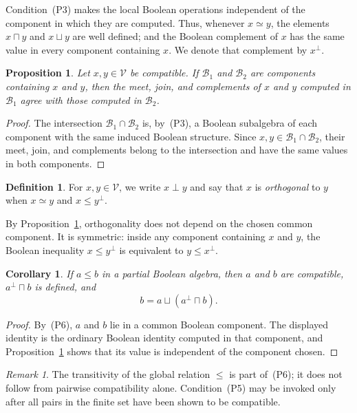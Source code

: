 \documentclass{article}   	%
\theoremstyle{plain}
\newtheorem{proposition}[theorem]{Proposition}
\newtheorem{corollary}[theorem]{Corollary}
\theoremstyle{definition}
\newtheorem{definition}[theorem]{Definition}
\theoremstyle{remark}
\newtheorem{remark}[theorem]{Remark}
\begin{document}
Condition~\rm(P3) makes the local Boolean operations independent of the
component in which they are computed.  Thus, whenever $x\simeq y$, the elements
$x\sqcap y$ and $x\sqcup y$ are well defined; and the Boolean complement of
$x$ has the same value in every component containing $x$.  We denote that
complement by $x^\perp$.

\begin{proposition}\label{prop:local-operations}
Let $x,y\in\mathcal V$ be compatible.  If $\mathcal B_1$ and $\mathcal B_2$
are components containing $x$ and $y$, then the meet, join, and complements
of $x$ and $y$ computed in $\mathcal B_1$ agree with those computed in
$\mathcal B_2$.
\end{proposition}

\begin{proof}
The intersection $\mathcal B_1\cap\mathcal B_2$ is, by~\rm(P3), a Boolean
subalgebra of each component with the same induced Boolean structure.  Since
$x,y\in\mathcal B_1\cap\mathcal B_2$, their meet, join, and complements belong
to the intersection and have the same values in both components.
\end{proof}

\begin{definition}\label{def:orth}
For $x,y\in\mathcal V$, we write $x\perp y$ and say that $x$ is
\emph{orthogonal} to $y$ when $x\simeq y$ and $x\le y^\perp$.
\end{definition}

By Proposition~\ref{prop:local-operations}, orthogonality does not depend on
the chosen common component.  It is symmetric: inside any component
containing $x$ and $y$, the Boolean inequality $x\le y^\perp$ is equivalent
to $y\le x^\perp$.

\begin{corollary}\label{cor:weak-oml}
If $a\le b$ in a partial Boolean algebra, then $a$ and $b$ are compatible,
$a^\perp\sqcap b$ is defined, and
\[
 b=a\sqcup(a^\perp\sqcap b).
\]
\end{corollary}

\begin{proof}
By~\rm(P6), $a$ and $b$ lie in a common Boolean component.  The displayed
identity is the ordinary Boolean identity computed in that component, and
Proposition~\ref{prop:local-operations} shows that its value is independent of
the component chosen.
\end{proof}

\begin{remark}\label{rem:global-order}
The transitivity of the global relation $\le$ is part of~\rm(P6); it does not
follow from pairwise compatibility alone.  Condition~\rm(P5) may be invoked
only after all pairs in the finite set have been shown to be compatible.
\end{remark}
\end{document}
